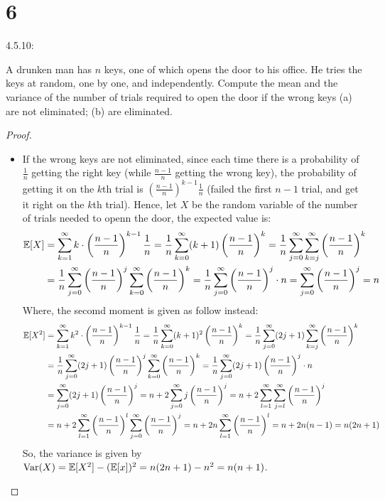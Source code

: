 \documentclass{article}
\begin{document}
\hfil

\section*{6}
\begin{ques}\label{q6}
    4.5.10:

    A drunken man has $n$ keys, one of which opens the door to his office. He tries the keys at random, one by one, and independently. Compute the mean and the variance of the number of trials required to open the door if the wrong keys (a) are not eliminated; (b) are eliminated.
\end{ques}
\begin{proof}

    \hfil

    \begin{itemize}
        \item[(a)] If the wrong keys are not eliminated, since each time there is a probability of $\frac{1}{n}$ getting the right key (while $\frac{n-1}{n}$ getting the wrong key), the probability of getting it on the $k$th trial is $\left(\frac{n-1}{n}\right)^{k-1}\frac{1}{n}$ (failed the first $n-1$ trial, and get it right on the $k$th trial). Hence, let $X$ be the random variable of the number of trials needed to openn the door, the expected value is:
        \begin{align}
            \mathbb{E}[X]&=\sum_{k=1}^{\infty}k\cdot \left(\frac{n-1}{n}\right)^{k-1}\frac{1}{n} = \frac{1}{n}\sum_{k=0}^{\infty}(k+1)\left(\frac{n-1}{n}\right)^{k} = \frac{1}{n}\sum_{j=0}^{\infty}\sum_{k=j}^{\infty}\left(\frac{n-1}{n}\right)^k\\
            &= \frac{1}{n}\sum_{j=0}^{\infty}\left(\frac{n-1}{n}\right)^j\sum_{k=0}^{\infty}\left(\frac{n-1}{n}\right)^k = \frac{1}{n}\sum_{j=0}^{\infty}\left(\frac{n-1}{n}\right)^j \cdot n = \sum_{j=0}^{\infty}\left(\frac{n-1}{n}\right)^j = n
        \end{align}
        Where, the secomd moment is given as follow instead:
        \begin{align}
            \mathbb{E}[X^2]&=\sum_{k=1}^{\infty}k^2\cdot \left(\frac{n-1}{n}\right)^{k-1}\frac{1}{n} = \frac{1}{n}\sum_{k=0}^{\infty}(k+1)^2\left(\frac{n-1}{n}\right)^k = \frac{1}{n}\sum_{j=0}^{\infty}(2j+1)\sum_{k=j}^{\infty}\left(\frac{n-1}{n}\right)^k\\
            &= \frac{1}{n}\sum_{j=0}^{\infty}(2j+1)\left(\frac{n-1}{n}\right)^j\sum_{k=0}^{\infty}\left(\frac{n-1}{n}\right)^k = \frac{1}{n}\sum_{j=0}^{\infty}(2j+1)\left(\frac{n-1}{n}\right)^j\cdot n\\
            &= \sum_{j=0}^{\infty}(2j+1)\left(\frac{n-1}{n}\right)^j = n + 2\sum_{j=0}^{\infty}j\left(\frac{n-1}{n}\right)^j = n+2\sum_{l=1}^{\infty}\sum_{j=l}^{\infty}\left(\frac{n-1}{n}\right)^j\\
            &= n+2\sum_{l=1}^{\infty}\left(\frac{n-1}{n}\right)^l\sum_{j=0}^{\infty}\left(\frac{n-1}{n}\right)^j = n+2n\sum_{l=1}^{\infty}\left(\frac{n-1}{n}\right)^l = n+2n(n-1) = n(2n+1)
        \end{align}
        So, the variance is given by $\textmd{Var}(X)=\mathbb{E}[X^2]-(\mathbb{E}[x])^2 = n(2n+1)-n^2 = n(n+1)$.


\end{itemize}
\end{proof}
\end{document}
